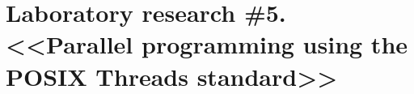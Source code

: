 { %
	\section{Laboratory research \#5. <<Parallel programming using the POSIX Threads standard>>}
	
	
	
}
